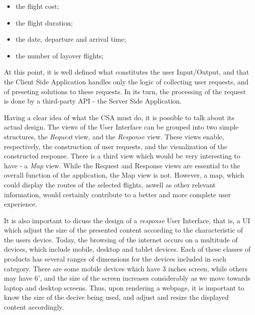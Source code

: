 \begin{itemize}[noitemsep,topsep=0pt,parsep=0pt,partopsep=0pt]
  \item the flight cost;
  \item the flight duration;
  \item the date, departure and arrival time;
  \item the number of layover flights;
\end{itemize}

At this point, it is well defined what constitutes the user Input/Output,
and that the Client Side Application handles only the logic of collecting user requests,
and of preseting solutions to these requests. In its turn, the processing of the request 
is done by a third-party API - the Server Side Application.

Having a clear idea of what the CSA must do, it is possible to talk about its actual design.
The views of the User Interface can be grouped into two simple structures, the \textit{Request} view,
and the \textit{Response} view. These views enable, respectively, the construction of user requests,
and the visualization of the constructed response. There is a third view which would be very interesting to have - a \textit{Map} view.
While the Request and Response views are essential to the overall function of the application,
the Map view is not. However, a map, which could display the routes of the selected flights, aswell as other relevant information,
would certainly contribute to a better and more complete user experience.

It is also important to dicuss the design of a \textit{response} User Interface,
that is, a UI which adjust the size of the presented content according to the characteristic of the users device.
Today, the browsing of the internet occurs on a multitude of devices, which include mobile, desktop and tablet devices.
Each of these classes of products has several ranges of dimensions for the devices included in each category.
There are some mobile devices which have 3 inches screen, while others may have 6', and 
the size of the screen increases considerably as we move towards laptop and desktop screens.
Thus, upon rendering a webpage, it is important to know the size of the decive being used,
and adjust and resize the displayed content accordingly.


